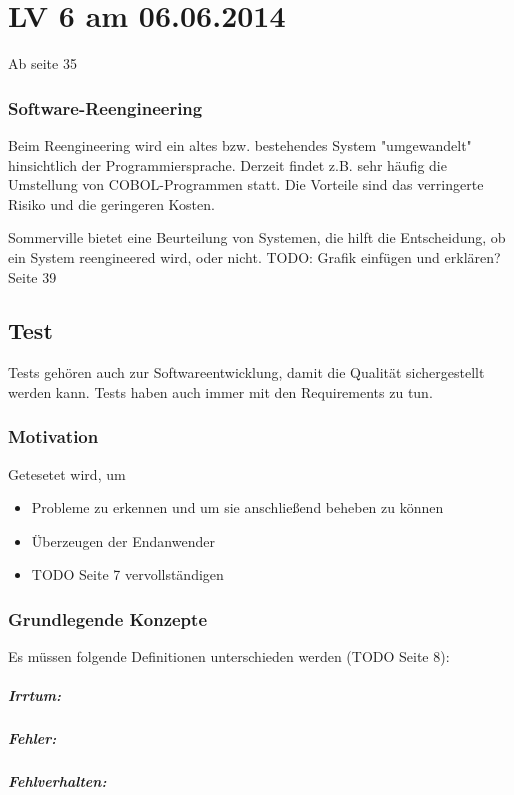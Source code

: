 \chapter{LV 6 am 06.06.2014}
Ab seite 35
\subsection{Software-Reengineering}
Beim Reengineering wird ein altes bzw. bestehendes System "umgewandelt" hinsichtlich der Programmiersprache. Derzeit findet z.B. sehr häufig die Umstellung von COBOL-Programmen statt. Die Vorteile sind das verringerte Risiko und die geringeren Kosten.

Sommerville bietet eine Beurteilung von Systemen, die hilft die Entscheidung, ob ein System reengineered wird, oder nicht. 
TODO: Grafik einfügen und erklären? Seite 39

\section{Test}
Tests gehören auch zur Softwareentwicklung, damit die Qualität sichergestellt werden kann. Tests haben auch immer mit den Requirements zu tun. 
\subsection{Motivation}
Getesetet wird, um 

\begin{itemize}
\item Probleme zu erkennen und um sie anschließend beheben zu können
\item Überzeugen der Endanwender
\item TODO Seite 7 vervollständigen
\end{itemize}

\subsection{Grundlegende Konzepte}
Es müssen folgende Definitionen unterschieden werden (TODO Seite 8):
\paragraph{Irrtum:}
\paragraph{Fehler:}
\paragraph{Fehlverhalten:}
